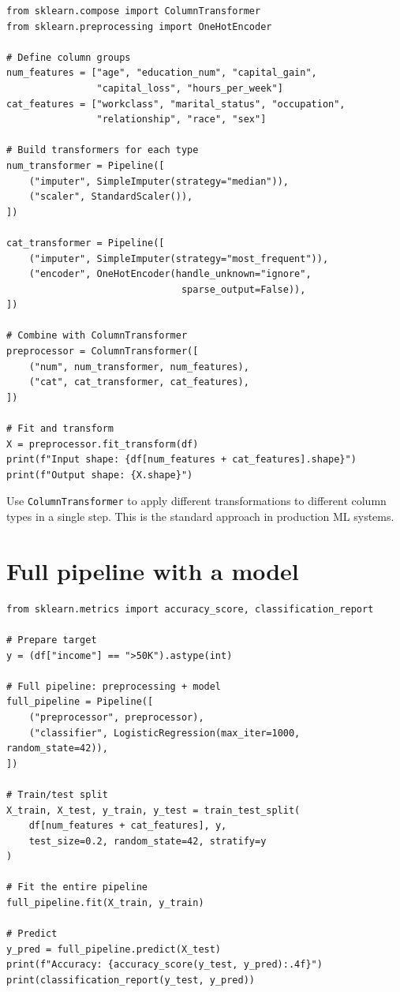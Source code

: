 \begin{verbatim}
from sklearn.compose import ColumnTransformer
from sklearn.preprocessing import OneHotEncoder

# Define column groups
num_features = ["age", "education_num", "capital_gain",
                "capital_loss", "hours_per_week"]
cat_features = ["workclass", "marital_status", "occupation",
                "relationship", "race", "sex"]

# Build transformers for each type
num_transformer = Pipeline([
    ("imputer", SimpleImputer(strategy="median")),
    ("scaler", StandardScaler()),
])

cat_transformer = Pipeline([
    ("imputer", SimpleImputer(strategy="most_frequent")),
    ("encoder", OneHotEncoder(handle_unknown="ignore",
                               sparse_output=False)),
])

# Combine with ColumnTransformer
preprocessor = ColumnTransformer([
    ("num", num_transformer, num_features),
    ("cat", cat_transformer, cat_features),
])

# Fit and transform
X = preprocessor.fit_transform(df)
print(f"Input shape: {df[num_features + cat_features].shape}")
print(f"Output shape: {X.shape}")
\end{verbatim}

\begin{preprocesstip}
Use \texttt{ColumnTransformer} to apply different transformations to different column types in a single step. This is the standard approach in production ML systems.
\end{preprocesstip}

\section{Full pipeline with a model}

\begin{verbatim}
from sklearn.metrics import accuracy_score, classification_report

# Prepare target
y = (df["income"] == ">50K").astype(int)

# Full pipeline: preprocessing + model
full_pipeline = Pipeline([
    ("preprocessor", preprocessor),
    ("classifier", LogisticRegression(max_iter=1000, random_state=42)),
])

# Train/test split
X_train, X_test, y_train, y_test = train_test_split(
    df[num_features + cat_features], y,
    test_size=0.2, random_state=42, stratify=y
)

# Fit the entire pipeline
full_pipeline.fit(X_train, y_train)

# Predict
y_pred = full_pipeline.predict(X_test)
print(f"Accuracy: {accuracy_score(y_test, y_pred):.4f}")
print(classification_report(y_test, y_pred))
\end{verbatim}

